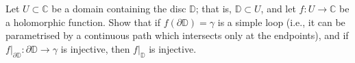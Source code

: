 \begin{problem}
    Let \( U \subset \mathbb{C} \) be a domain containing the disc \( \mathbb{D} \); that is, \( \mathbb{D} \subset U \), and let \( f : U \to \mathbb{C} \) be a holomorphic function. Show that if \( f\left( \partial \mathbb{D} \right) = \gamma \) is a simple loop (i.e., it can be parametrised by a continuous path which intersects only at the endpoints), and if \( f|_{\partial \mathbb{D}} : \partial \mathbb{D} \to \gamma \) is injective, then \( f|_{\mathbb{D}} \) is injective.
\end{problem}
